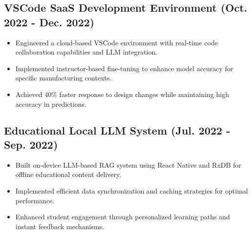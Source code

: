 \documentclass[a4paper,9pt]{article}
\begin{document}
\subsection*{VSCode SaaS Development Environment (Oct. 2022 - Dec. 2022)}
\begin{itemize}
    \item Engineered a cloud-based VSCode environment with real-time code collaboration capabilities and LLM integration.
    \item Implemented instructor-based fine-tuning to enhance model accuracy for specific manufacturing contexts.
    \item Achieved 40\% faster response to design changes while maintaining high accuracy in predictions.
\end{itemize}

\subsection*{Educational Local LLM System (Jul. 2022 - Sep. 2022)}
\begin{itemize}
    \item Built on-device LLM-based RAG system using React Native and RxDB for offline educational content delivery.
    \item Implemented efficient data synchronization and caching strategies for optimal performance.
    \item Enhanced student engagement through personalized learning paths and instant feedback mechanisms.
\end{itemize}
\end{document}
